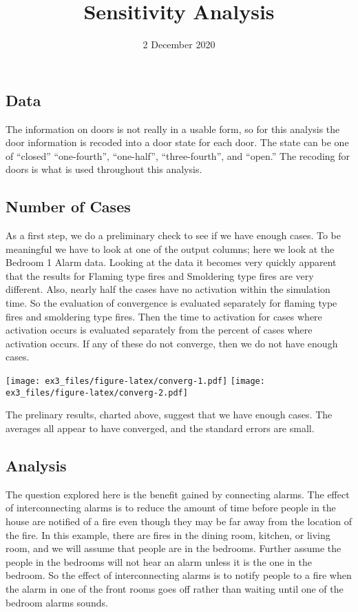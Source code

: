 \documentclass[
]{article}
\title{Sensitivity Analysis}
\author{}
\date{\vspace{-2.5em}2 December 2020}
\begin{document}
\maketitle

\hypertarget{data}{%
\subsection{Data}\label{data}}

The information on doors is not really in a usable form, so for this
analysis the door information is recoded into a door state for each
door. The state can be one of ``closed'' ``one-fourth'', ``one-half'',
``three-fourth'', and ``open.'' The recoding for doors is what is used
throughout this analysis.

\hypertarget{number-of-cases}{%
\subsection{Number of Cases}\label{number-of-cases}}

As a first step, we do a preliminary check to see if we have enough
cases. To be meaningful we have to look at one of the output columns;
here we look at the Bedroom 1 Alarm data. Looking at the data it becomes
very quickly apparent that the results for Flaming type fires and
Smoldering type fires are very different. Also, nearly half the cases
have no activation within the simulation time. So the evaluation of
convergence is evaluated separately for flaming type fires and
smoldering type fires. Then the time to activation for cases where
activation occurs is evaluated separately from the percent of cases
where activation occurs. If any of these do not converge, then we do not
have enough cases.

\texttt{[image: ex3\_files/figure-latex/converg-1.pdf]}
\texttt{[image: ex3\_files/figure-latex/converg-2.pdf]}

The prelinary results, charted above, suggest that we have enough cases.
The averages all appear to have converged, and the standard errors are
small.

\hypertarget{analysis}{%
\subsection{Analysis}\label{analysis}}

The question explored here is the benefit gained by connecting alarms.
The effect of interconnecting alarms is to reduce the amount of time
before people in the house are notified of a fire even though they may
be far away from the location of the fire. In this example, there are
fires in the dining room, kitchen, or living room, and we will assume
that people are in the bedrooms. Further assume the people in the
bedrooms will not hear an alarm unless it is the one in the bedroom. So
the effect of interconnecting alarms is to notify people to a fire when
the alarm in one of the front rooms goes off rather than waiting until
one of the bedroom alarms sounds.
\end{document}
